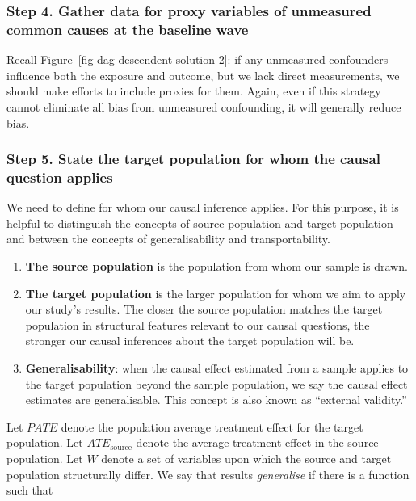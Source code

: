 \documentclass[
  singlecolumn]{article}
\begin{document}
\subsubsection{Step 4. Gather data for proxy variables of unmeasured
common causes at the baseline
wave}\label{step-4.-gather-data-for-proxy-variables-of-unmeasured-common-causes-at-the-baseline-wave}

Recall Figure~\ref{fig-dag-descendent-solution-2}: if any unmeasured
confounders influence both the exposure and outcome, but we lack direct
measurements, we should make efforts to include proxies for them. Again,
even if this strategy cannot eliminate all bias from unmeasured
confounding, it will generally reduce bias.

\subsubsection{Step 5. State the target population for whom the causal
question
applies}\label{step-5.-state-the-target-population-for-whom-the-causal-question-applies}

We need to define for whom our causal inference applies. For this
purpose, it is helpful to distinguish the concepts of source population
and target population and between the concepts of generalisability and
transportability.

\begin{enumerate}
\def\labelenumi{\arabic{enumi}.}
\item
  \textbf{The source population} is the population from whom our sample
  is drawn.
\item
  \textbf{The target population} is the larger population for whom we
  aim to apply our study's results. The closer the source population
  matches the target population in structural features relevant to our
  causal questions, the stronger our causal inferences about the target
  population will be.
\item
  \textbf{Generalisability}: when the causal effect estimated from a
  sample applies to the target population beyond the sample population,
  we say the causal effect estimates are generalisable. This concept is
  also known as ``external validity.''
\end{enumerate}

Let \(PATE\) denote the population average treatment effect for the
target population. Let \(ATE_{\text{source}}\) denote the average
treatment effect in the source population. Let \(W\) denote a set of
variables upon which the source and target population structurally
differ. We say that results \emph{generalise} if there is a function
such that
\end{document}
